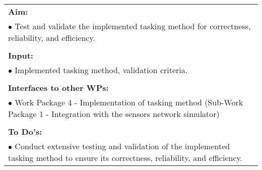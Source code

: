 \begin{table}[!h]
\begin{center}
\begin{tabular}{|p{35mm}||p{55mm}|p{50mm}||p{40mm}|}
      \hline\hline
      \multicolumn{4}{|p{150mm}|}{\textbf{Aim:}}                                                                                                                                                            \\
      \multicolumn{4}{|p{150mm}|}{$\bullet$ Test and validate the implemented tasking method for correctness, reliability, and efficiency.}                                                   \\
      \multicolumn{4}{|p{150mm}|}{}                                                                                                                                                                           \\
      \multicolumn{4}{|p{150mm}|}{\textbf{Input:}}                                                                                                                                                            \\
      \multicolumn{4}{|p{150mm}|}{$\bullet$  Implemented tasking method, validation criteria.}                                                                                                                                 \\
      \multicolumn{4}{|p{150mm}|}{}                                                                                                                                                                           \\
      \multicolumn{4}{|p{150mm}|}{\textbf{Interfaces to other WPs:}}                                                                                                                                    \\
      \multicolumn{4}{|p{150mm}|}{$\bullet$ Work Package 4 - Implementation of tasking method (Sub-Work Package 1 - Integration with the sensors network simulator)}                                                                                              \\
      \multicolumn{4}{|p{150mm}|}{}                                                                                                                                                                           \\
      \multicolumn{4}{|p{150mm}|}{\textbf{To Do's:}}                                                                                                                                                         \\
      \multicolumn{4}{|p{150mm}|}{$\bullet$ Conduct extensive testing and validation of the implemented tasking method to ensure its correctness, reliability, and efficiency.}\\

\end{tabular}
\end{center}
\end{table}

